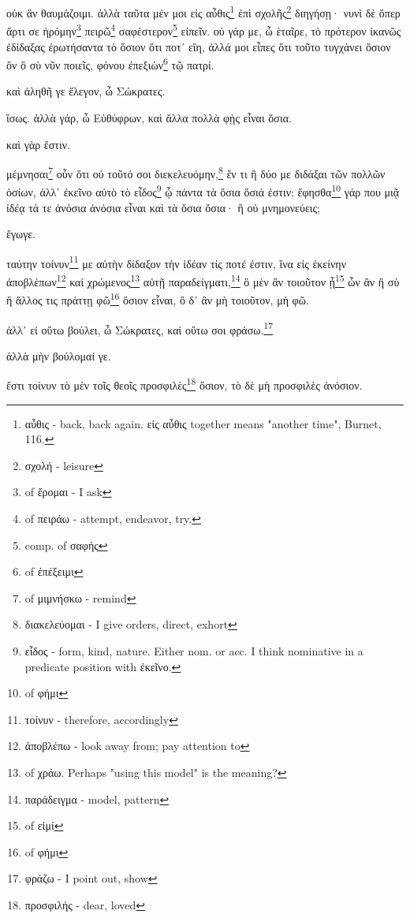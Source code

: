 οὐκ
ἂν
θαυμάζοιμι.
ἀλλὰ
ταῦτα
μέν
μοι
εἰς
αὖθις\footnote{αὖθις - back, back again. εἰς αὖθις together means "another time", Burnet, 116.}
ἐπὶ
σχολῆς\footnote{σχολή - leisure}
διηγήσῃ·
νυνὶ
δὲ
ὅπερ
ἄρτι
σε
ἠρόμην\footnote{ of ἔρομαι - I ask}
πειρῶ\footnote{ of πειράω - attempt, endeavor, try.}
\versification{[6d]}
σαφέστερον\footnote{comp. of σαφής}
εἰπεῖν.
οὐ
γάρ
με,
ὦ
ἑταῖρε,
τὸ
πρότερον
ἱκανῶς
ἐδίδαξας
ἐρωτήσαντα
τὸ
ὅσιον
ὅτι
ποτ᾽
εἴη,
ἀλλά
μοι
εἶπες
ὅτι
τοῦτο
τυγχάνει
ὅσιον
ὂν
ὃ
σὺ
νῦν
ποιεῖς,
φόνου
ἐπεξιὼν\footnote{ of ἐπέξειμι}
τῷ
πατρί.

καὶ
ἀληθῆ
γε
ἔλεγον,
ὦ
Σώκρατες.

ἴσως.
ἀλλὰ
γάρ,
ὦ
Εὐθύφρων,
καὶ
ἄλλα
πολλὰ
φῂς
εἶναι
ὅσια.

καὶ
γὰρ
ἔστιν.

μέμνησαι\footnote{ of μιμνήσκω - remind}
οὖν
ὅτι
οὐ
τοῦτό
σοι
διεκελευόμην,\footnote{διακελεύομαι - I give orders, direct, exhort}
ἕν
τι
ἢ
δύο
με
διδάξαι
τῶν
πολλῶν
ὁσίων,
ἀλλ᾽
ἐκεῖνο
αὐτὸ
τὸ
εἶδος\footnote{εἶδος - form, kind, nature. Either nom. or acc. I think nominative in a predicate position with ἐκεῖνο.}
ᾧ
πάντα
τὰ
ὅσια
ὅσιά
ἐστιν;
ἔφησθα\footnote{ of φήμι}
γάρ
που
μιᾷ
ἰδέᾳ
\versification{[6e]}
τά
τε
ἀνόσια
ἀνόσια
εἶναι
καὶ
τὰ
ὅσια
ὅσια·
ἢ
οὐ
μνημονεύεις;

ἔγωγε.

ταύτην
τοίνυν\footnote{τοίνυν - therefore, accordingly}
με
αὐτὴν
δίδαξον
τὴν
ἰδέαν
τίς
ποτέ
ἐστιν,
ἵνα
εἰς
ἐκείνην
ἀποβλέπων\footnote{ἀποβλέπω - look away from; pay attention to}
καὶ
χρώμενος\footnote{ of χράω. Perhaps "using this model" is the meaning?}
αὐτῇ
παραδείγματι,\footnote{παράδειγμα - model, pattern}
ὃ
μὲν
ἂν
τοιοῦτον
ᾖ\footnote{ of εἰμί}
ὧν
ἂν
ἢ
σὺ
ἢ
ἄλλος
τις
πράττῃ
φῶ\footnote{ of φήμι}
ὅσιον
εἶναι,
ὃ
δ᾽
ἂν
μὴ
τοιοῦτον,
μὴ
φῶ.

ἀλλ᾽
εἰ
οὕτω
βούλει,
ὦ
Σώκρατες,
καὶ
οὕτω
σοι
φράσω.\footnote{φράζω - I point out, show}

ἀλλὰ
μὴν
βούλομαί
γε.

ἔστι
τοίνυν
τὸ
μὲν
τοῖς
θεοῖς
προσφιλὲς\footnote{προσφιλής - dear, loved}
ὅσιον,
τὸ
\versification{[7a]}
δὲ
μὴ
προσφιλὲς
ἀνόσιον.



